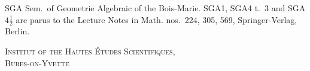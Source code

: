 \documentclass[12pt,a4paper]{article}
\theoremstyle{plain}
\theoremstyle{definition}
\theoremstyle{remark}
\begin{document}
SGA Sem.~of Geometrie Algebraic of the Bois-Marie. SGA1, SGA4 t.~3 and SGA$4\frac{1}{2}$ are parus to the Lecture Notes in Math. nos.~224, 305, 569, Springer-Verlag, Berlin.

\vspace{1cm}
\begin{flushright}
\textsc{Institut of the Hautes \'Etudes Scientifiques,}\\
\textsc{Bures-on-Yvette}
\end{flushright}
\end{document}
